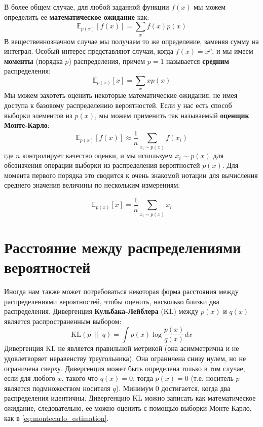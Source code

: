 В более общем случае, для любой заданной функции $f(x)$ мы можем определить ее \textbf{математическое ожидание} как:
%
\begin{equation}
\mathbb{E}_{p(x)}\left[f(x)\right]=\sum_{x}f(x)p(x)
\label{eq:expected_value}
\end{equation}
%
В вещественнозначном случае мы получаем то же определение, заменяя сумму на интеграл. Особый интерес представляют случаи, когда $f(x)=x^p$, и мы имеем \textbf{моменты} (порядка $p$) распределения, причем $p=1$ называется \textbf{средним} распределения:
%
$$
\mathbb{E}_{p(x)}\left[x\right]=\sum_{x}xp(x)
$$
%
Мы можем захотеть оценить некоторые математические ожидания, не имея доступа к базовому распределению вероятностей. Если у нас есть способ выборки элементов из $p(x)$, мы можем применить так называемый \textbf{оценщик Монте-Карло}:
%
\begin{equation}
\mathbb{E}_{p(x)}\left[f(x)\right]\approx \frac{1}{n}\sum_{x_i \sim p(x)}f(x_i)
\label{eq:montecarlo_estimation}
\end{equation}
%
где $n$ контролирует качество оценки, и мы используем $x_i \sim p(x)$ для обозначения операции выборки из распределения вероятностей $p(x)$. Для момента первого порядка это сводится к очень знакомой нотации для вычисления среднего значения величины по нескольким измерениям:

$$
\mathbb{E}_{p(x)}\left[x\right]=\frac{1}{n}\sum_{x_i \sim p(x)}x_i
$$

\section{Расстояние между распределениями вероятностей}

Иногда нам также может потребоваться некоторая форма расстояния между распределениями вероятностей, чтобы оценить, насколько близки два распределения. Дивергенция \textbf{Кульбака-Лейблера} (KL) между $p(x)$ и $q(x)$ является распространенным выбором:
%
$$
\text{KL}(p \;\lVert\; q) = \int p(x)\log\frac{p(x)}{q(x)}dx
$$
%
Дивергенция KL не является правильной метрикой (она асимметрична и не удовлетворяет неравенству треугольника). Она ограничена снизу нулем, но не ограничена сверху. Дивергенция может быть определена только в том случае, если для любого $x$, такого что $q(x)=0$, тогда $p(x)=0$ (т.е. носитель $p$ является подмножеством носителя $q$). Минимум $0$ достигается, когда два распределения идентичны. Дивергенцию KL можно записать как математическое ожидание, следовательно, ее можно оценить с помощью выборки Монте-Карло, как в \eqref{eq:montecarlo_estimation}.

